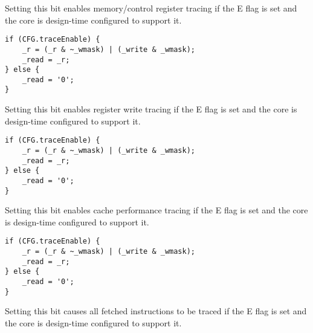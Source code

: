 Setting this bit enables memory/control register tracing if the E flag is set 
and the core is design-time configured to support it.

\declaration{}
\implementation{}
\begin{lstlisting}
if (CFG.traceEnable) {
    _r = (_r & ~_wmask) | (_write & _wmask);
    _read = _r;
} else {
    _read = '0';
}
\end{lstlisting}

Setting this bit enables register write tracing if the E flag is set and the 
core is design-time configured to support it.

\declaration{}
\implementation{}
\begin{lstlisting}
if (CFG.traceEnable) {
    _r = (_r & ~_wmask) | (_write & _wmask);
    _read = _r;
} else {
    _read = '0';
}
\end{lstlisting}

Setting this bit enables cache performance tracing if the E flag is set and the 
core is design-time configured to support it.

\declaration{}
\implementation{}
\begin{lstlisting}
if (CFG.traceEnable) {
    _r = (_r & ~_wmask) | (_write & _wmask);
    _read = _r;
} else {
    _read = '0';
}
\end{lstlisting}

Setting this bit causes all fetched instructions to be traced if the E flag is 
set and the core is design-time configured to support it.

